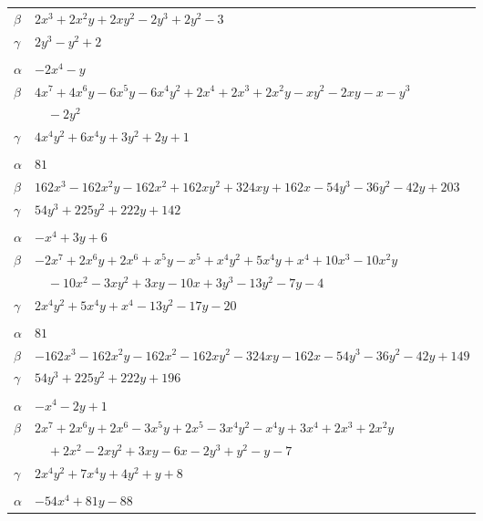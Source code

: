 \documentclass[11pt]{article}
\begin{document}
\begin{longtable}{@{}ll@{}}
$\beta$ & $2x^{3}+2x^{2}y+2xy^{2}-2y^{3}+2y^{2}-3$\\
$\gamma$ & $2y^{3}-y^{2}+2$\\
\addlinespace[3pt]
\multicolumn{2}{@{}l}{$\{i,j\}=\{2,10\}$, $k_{ij}=1$}\\
$\alpha$ & $-2x^{4}-y$\\
$\beta$ & $4x^{7}+4x^{6}y-6x^{5}y-6x^{4}y^{2}+2x^{4}+2x^{3}+2x^{2}y-xy^{2}-2xy-x-y^{3}$\\
 & $\quad -2y^{2}$\\
$\gamma$ & $4x^{4}y^{2}+6x^{4}y+3y^{2}+2y+1$\\
\addlinespace[3pt]
\multicolumn{2}{@{}l}{$\{i,j\}=\{3,7\}$, $k_{ij}=2^{2}\cdot 5$}\\
$\alpha$ & $81$\\
$\beta$ & $162x^{3}-162x^{2}y-162x^{2}+162xy^{2}+324xy+162x-54y^{3}-36y^{2}-42y+203$\\
$\gamma$ & $54y^{3}+225y^{2}+222y+142$\\
\addlinespace[3pt]
\multicolumn{2}{@{}l}{$\{i,j\}=\{3,9\}$, $k_{ij}=2\cdot 5$}\\
$\alpha$ & $-x^{4}+3y+6$\\
$\beta$ & $-2x^{7}+2x^{6}y+2x^{6}+x^{5}y-x^{5}+x^{4}y^{2}+5x^{4}y+x^{4}+10x^{3}-10x^{2}y$\\
 & $\quad -10x^{2}-3xy^{2}+3xy-10x+3y^{3}-13y^{2}-7y-4$\\
$\gamma$ & $2x^{4}y^{2}+5x^{4}y+x^{4}-13y^{2}-17y-20$\\
\addlinespace[3pt]
\multicolumn{2}{@{}l}{$\{i,j\}=\{4,6\}$, $k_{ij}=2^{7}$}\\
$\alpha$ & $81$\\
$\beta$ & $-162x^{3}-162x^{2}y-162x^{2}-162xy^{2}-324xy-162x-54y^{3}-36y^{2}-42y+149$\\
$\gamma$ & $54y^{3}+225y^{2}+222y+196$\\
\addlinespace[3pt]
\multicolumn{2}{@{}l}{$\{i,j\}=\{4,10\}$, $k_{ij}=2^{4}$}\\
$\alpha$ & $-x^{4}-2y+1$\\
$\beta$ & $2x^{7}+2x^{6}y+2x^{6}-3x^{5}y+2x^{5}-3x^{4}y^{2}-x^{4}y+3x^{4}+2x^{3}+2x^{2}y$\\
 & $\quad +2x^{2}-2xy^{2}+3xy-6x-2y^{3}+y^{2}-y-7$\\
$\gamma$ & $2x^{4}y^{2}+7x^{4}y+4y^{2}+y+8$\\
\addlinespace[3pt]
\multicolumn{2}{@{}l}{$\{i,j\}=\{5,10\}$, $k_{ij}=2^{3}\cdot 5^{2}$}\\
$\alpha$ & $-54x^{4}+81y-88$\\

\end{longtable}
\end{document}
